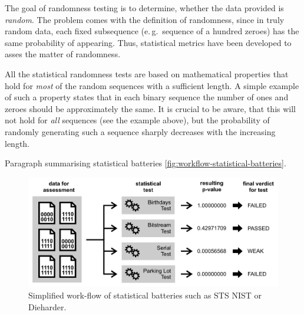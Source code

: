\documentclass[12pt,oneside]{fithesis2}		%
\renewcommand{\_}{\leavevmode \kern0.0em\vbox{\hrule width0.4em}}
\begin{document}
The goal of randomness testing is to determine, whether the data provided is \textit{random}. 
The problem comes with the definition of randomness, since in truly random data, 
each fixed subsequence (e.\,g.\ sequence of a hundred zeroes) has the same probability of appearing.
Thus, statistical metrics have been developed to asses the matter of randomness.

All the statistical randomness tests are based on mathematical properties that hold for
\textit{most} of the random sequences with a sufficient length.
A simple example of such a property states that in each binary sequence the number of ones and zeroes should be 
approximately the same. It is crucial to be aware, that this will not hold for \textit{all} sequences (see the example above),
but the probability of randomly generating such a sequence sharply decreases with the increasing length.

Paragraph summarising statistical batteries \autoref{fig:workflow-statistical-batteries}.

\begin{figure}[b!]
\centering
\includegraphics[width=\textwidth]{images/workflow-statistical-batteries}
\caption{Simplified work-flow of statistical batteries such as STS NIST or Dieharder.}
\label{fig:workflow-statistical-batteries}
\end{figure}
\end{document}
